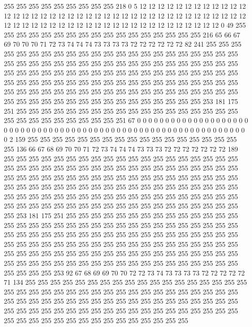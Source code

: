 255 255 255 255 255 255 255 255 255 218 0 5 12 12 12 12 12 12 12 12
12 12 12 12 12 12 12 12 12 12 12 12 12 12 12 12 12 12 12 12
12 12 12 12 12 12 12 12 12 12 12 12 12 12 12 12 12 12 12 12
12 12 12 12 12 12 12 12 12 12 12 12 12 12 12 0 49 255 255 255
255 255 255 255 255 255 255 255 255 255 255 255 255 255 216 65 66 67 69 70
70 70 71 72 73 74 74 74 73 73 73 73 72 72 72 72 72 72 82 241
255 255 255 255 255 255 255 255 255 255 255 255 255 255 255 255 255 255 255 255
255 255 255 255 255 255 255 255 255 255 255 255 255 255 255 255 255 255 255 255
255 255 255 255 255 255 255 255 255 255 255 255 255 255 255 255 255 255 255 255
255 255 255 255 255 255 255 255 255 255 255 255 255 255 255 255 255 255 255 255
255 255 255 255 255 255 255 255 255 255 255 255 255 255 255 255 255 255 255 255
255 255 255 255 255 255 255 255 255 255 255 255 255 255 253 181 175 251 255 255
255 255 255 255 255 255 255 255 255 255 255 255 255 255 255 255 255 255 255 255
255 255 255 255 255 251 67 0 0 0 0 0 0 0 0 0 0 0 0 0
0 0 0 0 0 0 0 0 0 0 0 0 0 0 0 0 0 0 0 0
0 0 0 0 0 0 0 0 0 0 0 0 0 0 0 0 0 0 0 0
0 0 0 0 0 0 0 0 0 0 0 2 159 255 255 255 255 255 255 255
255 255 255 255 255 255 255 255 255 255 255 136 66 67 68 69 70 70 71 72
73 74 74 74 73 73 73 72 72 72 72 72 72 72 189 255 255 255 255 255
255 255 255 255 255 255 255 255 255 255 255 255 255 255 255 255 255 255 255 255
255 255 255 255 255 255 255 255 255 255 255 255 255 255 255 255 255 255 255 255
255 255 255 255 255 255 255 255 255 255 255 255 255 255 255 255 255 255 255 255
255 255 255 255 255 255 255 255 255 255 255 255 255 255 255 255 255 255 255 255
255 255 255 255 255 255 255 255 255 255 255 255 255 255 255 255 255 255 255 255
255 255 255 255 255 255 255 255 255 255 253 181 175 251 255 255 255 255 255 255
255 255 255 255 255 255 255 255 255 255 255 255 255 255 255 255 255 255 255 255
255 255 255 255 255 255 255 255 255 255 255 255 255 255 255 255 255 255 255 255
255 255 255 255 255 255 255 255 255 255 255 255 255 255 255 255 255 255 255 255
255 255 255 255 255 255 255 255 255 255 255 255 255 255 255 255 255 255 255 255
255 255 255 255 255 255 255 255 255 255 255 255 255 255 255 255 255 255 255 255
255 255 255 255 255 255 255 253 92 67 68 69 69 70 70 72 72 73 74 73
73 73 73 72 72 72 72 72 71 134 255 255 255 255 255 255 255 255 255 255
255 255 255 255 255 255 255 255 255 255 255 255 255 255 255 255 255 255 255 255
255 255 255 255 255 255 255 255 255 255 255 255 255 255 255 255 255 255 255 255
255 255 255 255 255 255 255 255 255 255 255 255 255 255 255 255 255 255 255 255
255 255 255 255 255 255 255 255 255 255 255 255 255 255 255 255 255 255 255 255
